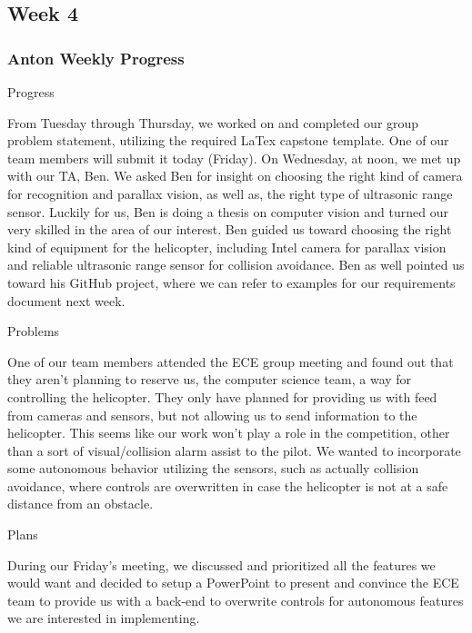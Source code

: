 \documentclass[onecolumn, oneside, letterpaper, draftclsnofoot, 10pt, compsoc]{IEEEtran}
\begin{document}
\subsection{Week 4}
\subsubsection{Anton Weekly Progress}
Progress

From Tuesday through Thursday, we worked on and completed our group problem statement, utilizing the required LaTex capstone template. One of our team members will submit it today (Friday). On Wednesday, at noon, we met up with our TA, Ben. We asked Ben for insight on choosing the right kind of camera for recognition and parallax vision, as well as, the right type of ultrasonic range sensor. Luckily for us, Ben is doing a thesis on computer vision and turned our very skilled in the area of our interest. Ben guided us toward choosing the right kind of equipment for the helicopter, including Intel camera for parallax vision and reliable ultrasonic range sensor for collision avoidance. Ben as well pointed us toward his GitHub project, where we can refer to examples for our requirements document next week.

Problems

One of our team members attended the ECE group meeting and found out that they aren't planning to reserve us, the computer science team, a way for controlling the helicopter. They only have planned for providing us with feed from cameras and sensors, but not allowing us to send information to the helicopter. This seems like our work won't play a role in the competition, other than a sort of visual/collision alarm assist to the pilot. We wanted to incorporate some autonomous behavior utilizing the sensors, such as actually collision avoidance, where controls are overwritten in case the helicopter is not at a safe distance from an obstacle.

Plans

During our Friday's meeting, we discussed and prioritized all the features we would want and decided to setup a PowerPoint to present and convince the ECE team to provide us with a back-end to overwrite controls for autonomous features we are interested in implementing.
\end{document}
